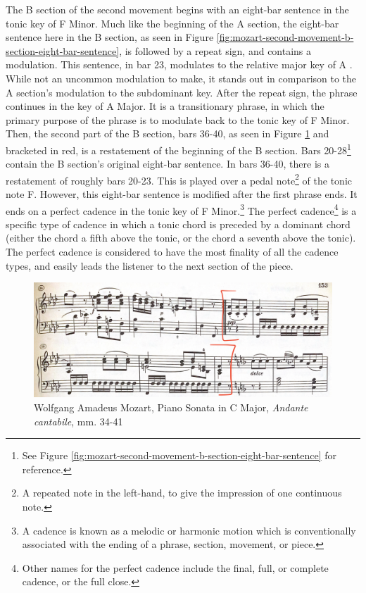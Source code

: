 The B section of the second movement begins with an eight-bar sentence in the tonic key of F Minor. Much like the beginning of the A section, the eight-bar sentence here in the B section, as seen in Figure \ref{fig:mozart-second-movement-b-section-eight-bar-sentence}\autocite{Henle_1977}, is followed by a repeat sign, and contains a modulation. This sentence, in bar 23, modulates to the relative major key of A \musFlat{}. While not an uncommon modulation to make, it stands out in comparison to the A section's modulation to the subdominant key. After the repeat sign, the phrase continues in the key of A\musFlat{} Major. It is a transitionary phrase, in which the primary purpose of the phrase is to modulate back to the tonic key of F Minor. Then, the second part of the B section, bars 36-40, as seen in Figure \ref{fig:mozart-second-movement-second-half-b-section}\autocite{Henle_1977} and bracketed in red, is a restatement of the beginning of the B section. Bars 20-28\footnote{See Figure \ref{fig:mozart-second-movement-b-section-eight-bar-sentence} for reference.} contain the B section's original eight-bar sentence. In bars 36-40, there is a restatement of roughly bars 20-23. This is played over a pedal note\footnote{A repeated note in the left-hand, to give the impression of one continuous note.} of the tonic note F. However, this eight-bar sentence is modified after the first phrase ends. It ends on a perfect cadence\autocite{Nagley_Whittall_2011} in the tonic key of F Minor.\footnote{A cadence is known as a melodic or harmonic motion which is conventionally associated with the ending of a phrase, section, movement, or piece.} The perfect cadence\footnote{Other names for the perfect cadence include the final, full, or complete cadence, or the full close.} is a specific type of cadence in which a tonic chord is preceded by a dominant chord (either the chord a fifth above the tonic, or the chord a seventh above the tonic). The perfect cadence is considered to have the most finality of all the cadence types, and easily leads the listener to the next section of the piece.

\begin{figure}[h]
	\centering
	\includegraphics[width=\textwidth]{figures/mozart-second-movement-second-half-b-section.jpg}
	\caption{Wolfgang Amadeus Mozart, Piano Sonata in C Major, \textit{Andante cantabile}, mm. 34-41}
	\label{fig:mozart-second-movement-second-half-b-section}
\end{figure}

